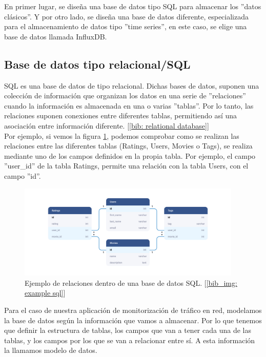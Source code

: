 \documentclass[a4paper, oneside, 12pt]{book}
\begin{document}
	\noindent En primer lugar, se diseña una base de datos tipo SQL para almacenar los ''datos clásicos''. Y por otro lado, se diseña una base de datos diferente, especializada para el almacenamiento de datos tipo ''time series'', en este caso, se elige una base de datos llamada InfluxDB.
	
	\subsection{Base de datos tipo relacional/SQL}
	
	\noindent SQL es una base de datos de tipo relacional. Dichas bases de datos, suponen una colección de información que organizan los datos en una serie de ''relaciones'' cuando la información es almacenada en una o varias ''tablas''. Por lo tanto, las relaciones suponen conexiones entre diferentes tablas, permitiendo así una asociación entre información diferente. [\ref{bib: relational database}] \\
	
	\noindent Por ejemplo, si vemos la figura \ref{img: example sql}, podemos comprobar como se realizan las relaciones entre las diferentes tablas (Ratings, Users, Movies o Tags), se realiza mediante uno de los campos definidos en la propia tabla. Por ejemplo, el campo ''user\_id'' de la tabla Ratings, permite una relación con la tabla Users, con el campo ''id''.
	
	\begin{figure}[h!]
		\begin{center}
			\includegraphics[width=0.95\textwidth]{img/example_relational_database.jpg}
			\caption{Ejemplo de relaciones dentro de una base de datos SQL. [\ref{bib_img: example sql}]}
			\label{img: example sql}
		\end{center}
	\end{figure}
	
	\noindent Para el caso de nuestra aplicación de monitorización de tráfico en red, modelamos la base de datos según la información que vamos a almacenar. Por lo que tenemos que definir la estructura de tablas, los campos que van a tener cada una de las tablas, y los campos por los que se van a relacionar entre sí. A esta información la llamamos modelo de datos.
	
\end{document}
